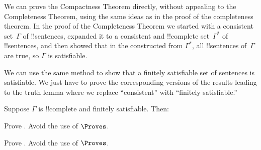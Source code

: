 \documentclass[../../../include/open-logic-section]{subfiles}
\begin{document}
      {}
      {}

We can prove the Compactness Theorem directly, without appealing to
the Completeness Theorem, using the same ideas as in the proof of the
completeness theorem.  In the proof of the Completeness Theorem we
started with a consistent set~$\Gamma$ of !!{sentence}s, expanded it
to a consistent and !!{complete}
set~$\Gamma^*$ of !!{sentence}s, and then showed that in the
constructed from $\Gamma^*$, all !!{sentence}s of~$\Gamma$ are true,
so $\Gamma$ is satisfiable.

We can use the same method to show that a finitely satisfiable set of
sentences is satisfiable. We just have to prove the corresponding
versions of the results leading to the truth lemma where we replace
``consistent'' with ``finitely satisfiable.''

\begin{prop}
Suppose $\Gamma$ is !!{complete} and finitely satisfiable. Then:
\begin{enumerate}


\end{enumerate}
\end{prop}

\begin{prob}
Prove . Avoid the use of $\Proves$.
\end{prob}
\tagendprob

\begin{prob}
Prove . Avoid the use of $\Proves$.
\end{prob}
\tagendprob

\end{document}
